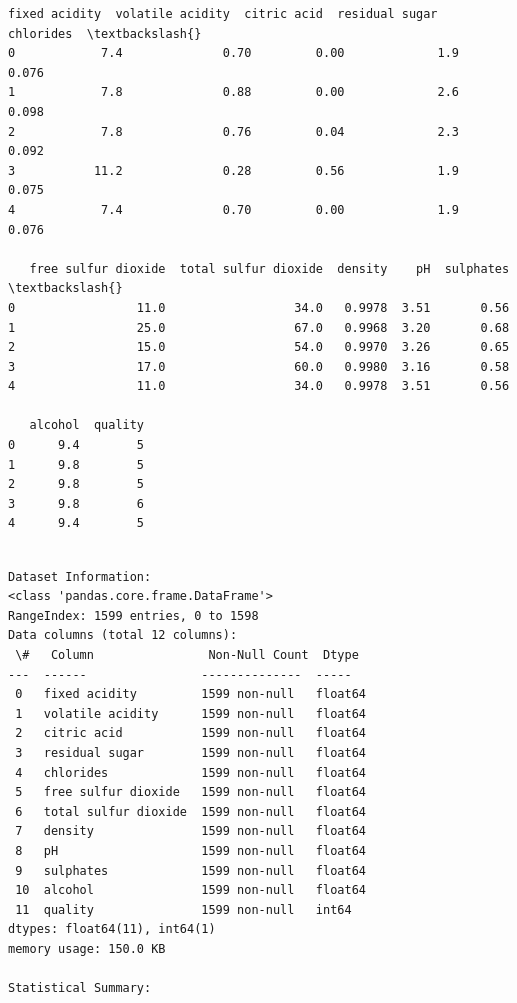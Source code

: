 \documentclass[11pt]{article}
\begin{document}
    
    \begin{Verbatim}[commandchars=\\\{\}]
   fixed acidity  volatile acidity  citric acid  residual sugar  chlorides  \textbackslash{}
0            7.4              0.70         0.00             1.9      0.076   
1            7.8              0.88         0.00             2.6      0.098   
2            7.8              0.76         0.04             2.3      0.092   
3           11.2              0.28         0.56             1.9      0.075   
4            7.4              0.70         0.00             1.9      0.076   

   free sulfur dioxide  total sulfur dioxide  density    pH  sulphates  \textbackslash{}
0                 11.0                  34.0   0.9978  3.51       0.56   
1                 25.0                  67.0   0.9968  3.20       0.68   
2                 15.0                  54.0   0.9970  3.26       0.65   
3                 17.0                  60.0   0.9980  3.16       0.58   
4                 11.0                  34.0   0.9978  3.51       0.56   

   alcohol  quality  
0      9.4        5  
1      9.8        5  
2      9.8        5  
3      9.8        6  
4      9.4        5  
    \end{Verbatim}

    
    \begin{Verbatim}[commandchars=\\\{\}]

Dataset Information:
<class 'pandas.core.frame.DataFrame'>
RangeIndex: 1599 entries, 0 to 1598
Data columns (total 12 columns):
 \#   Column                Non-Null Count  Dtype
---  ------                --------------  -----
 0   fixed acidity         1599 non-null   float64
 1   volatile acidity      1599 non-null   float64
 2   citric acid           1599 non-null   float64
 3   residual sugar        1599 non-null   float64
 4   chlorides             1599 non-null   float64
 5   free sulfur dioxide   1599 non-null   float64
 6   total sulfur dioxide  1599 non-null   float64
 7   density               1599 non-null   float64
 8   pH                    1599 non-null   float64
 9   sulphates             1599 non-null   float64
 10  alcohol               1599 non-null   float64
 11  quality               1599 non-null   int64
dtypes: float64(11), int64(1)
memory usage: 150.0 KB

Statistical Summary:
    \end{Verbatim}
\end{document}
